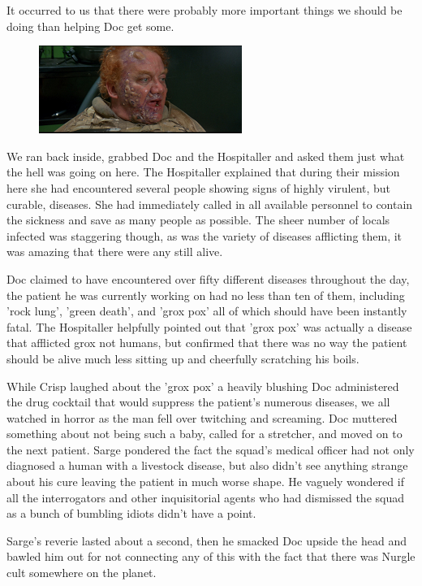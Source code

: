 It occurred to us that there were probably more important things we should be doing than helping Doc get some.

\begin{figure}
	\begin{center}
		\includegraphics[width=\figwidth]{pics/6/22.png}
	\end{center}
\end{figure}
We ran back inside, grabbed Doc and the Hospitaller and asked them just what the hell was going on here. 
The Hospitaller explained that during their mission here she had encountered several people showing signs of highly virulent, but curable, diseases. 
She had immediately called in all available personnel to contain the sickness and save as many people as possible. 
The sheer number of locals infected was staggering though, as was the variety of diseases afflicting them, it was amazing that there were any still alive.

Doc claimed to have encountered over fifty different diseases throughout the day, the patient he was currently working on had no less than ten of them, including 'rock lung', 'green death', and 'grox pox' all of which should have been instantly fatal. 
The Hospitaller helpfully pointed out that 'grox pox' was actually a disease that afflicted grox not humans, but confirmed that there was no way the patient should be alive much less sitting up and cheerfully scratching his boils.

While Crisp laughed about the 'grox pox' a heavily blushing Doc administered the drug cocktail that would suppress the patient's numerous diseases, we all watched in horror as the man fell over twitching and screaming. 
Doc muttered something about not being such a baby, called for a stretcher, and moved on to the next patient. 
Sarge pondered the fact the squad's medical officer had not only diagnosed a human with a livestock disease, but also didn't see anything strange about his cure leaving the patient in much worse shape. 
He vaguely wondered if all the interrogators and other inquisitorial agents who had dismissed the squad as a bunch of bumbling idiots didn't have a point.

Sarge's reverie lasted about a second, then he smacked Doc upside the head and bawled him out for not connecting any of this with the fact that there was Nurgle cult somewhere on the planet.

